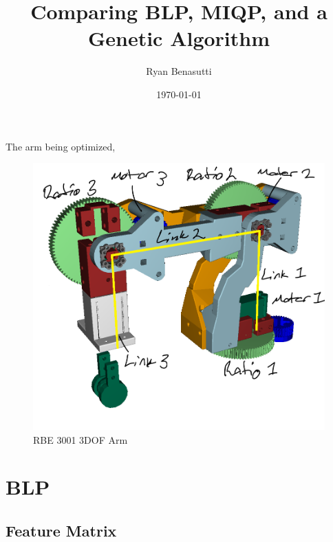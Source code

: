 \documentclass{article}
\title{Comparing BLP, MIQP, and a Genetic Algorithm}
\author{Ryan Benasutti}
\date{\today}
\begin{document}
\maketitle

The arm being optimized,
\begin{figure}[h]
    \centering
    \includegraphics[scale=0.3]{annotated-arm.png}
    \caption{RBE 3001 3DOF Arm}
    \label{fig:annotated_arn}
\end{figure}

\FloatBarrier{}
\section{BLP}

\FloatBarrier{}
\subsection{Feature Matrix}
\end{document}
